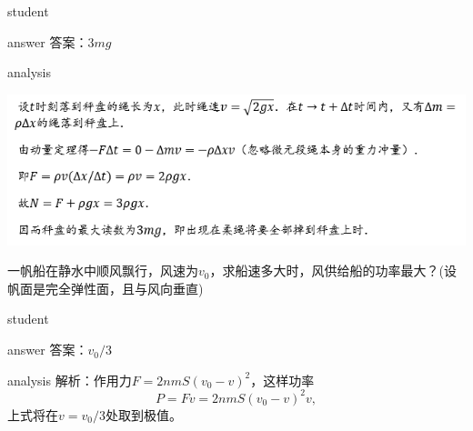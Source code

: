 \begin{example}
	\begin{taggedblock}{student}
		\vspace*{2cm}
	\end{taggedblock}
	
	
	\begin{taggedblock}{answer}
		答案：$ 3mg $
	\end{taggedblock}
	
	
	\begin{taggedblock}{analysis}
	\begin{center}
\includegraphics[width=0.8\linewidth]{image/momentum-17}
\end{center}

	\end{taggedblock}
\end{example}


\begin{example}
	一帆船在静水中顺风飘行，风速为$ v_0 $，求船速多大时，风供给船的功率最大？(设帆面是完全弹性面，且与风向垂直)
	
	\begin{taggedblock}{student}
		\vspace*{2cm}
	\end{taggedblock}
	
	
	\begin{taggedblock}{answer}
		答案：$ v_0/3 $
	\end{taggedblock}
	
	
	\begin{taggedblock}{analysis}
		解析：作用力$ F = 2nmS(v_0-v)^2 $，这样功率
		\[
		P = Fv = 2nmS(v_0-v)^2v,		\]
		上式将在$ v = v_0/3 $处取到极值。
	\end{taggedblock}
	
\end{example}


